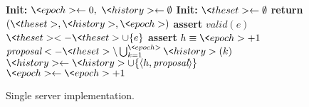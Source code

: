 \begin{figure}[t!]
  \begin{adjustbox}{minipage=[t]{\columnwidth}}
    \begin{algorithm}[H]
         \caption{\small Single server implementation.}%
        \label{alg:sequential}%
              \small
              \begin{algorithmic}[1]
                \State \textbf{Init:} $\<epoch> \leftarrow 0,$
                \hspace{2em}
                $\<history> \leftarrow \emptyset$\label{seq:history} 
                \State \textbf{Init:} $\<theset> \leftarrow \emptyset$\label{seq:theset}
                  \State \textbf{return} $(\<theset>, \<history>, \<epoch>)$
                \EndFunction
                  \State \textbf{assert} {\(valid(e)\)}
                  \State \(\<theset> <- \<theset> \cup \{e\}\)
                \EndFunction
                    \State \textbf{assert} $h \equiv \<epoch> + 1$
                    \State \(\textit{proposal} <- \<theset> \setminus \bigcup_{k=1}^{\<epoch>} \<history>(k)\)
                    \State $\<history> \leftarrow \<history> \cup \{\langle h, \textit{proposal} \rangle\}$
                    \State $\<epoch> \leftarrow \<epoch> + 1$
                \EndFunction
              \end{algorithmic}
            \end{algorithm}
      \end{adjustbox}%
  \end{figure}

